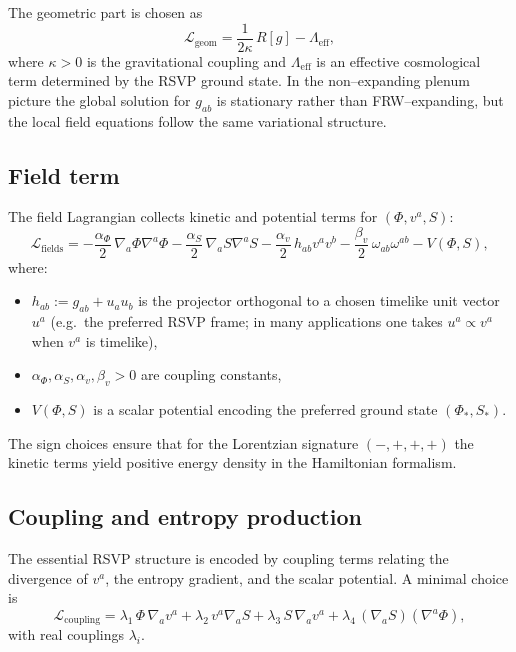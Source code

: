 The geometric part is chosen as
\begin{equation}
\mathcal{L}_{\mathrm{geom}}
  = \frac{1}{2\kappa}\,R[g]
    - \Lambda_{\mathrm{eff}},
\end{equation}
where $\kappa>0$ is the gravitational coupling and $\Lambda_{\mathrm{eff}}$ is an effective cosmological term determined by the RSVP ground state. In the non–expanding plenum picture the global solution for $g_{ab}$ is stationary rather than FRW–expanding, but the local field equations follow the same variational structure.

\subsection{Field term}

The field Lagrangian collects kinetic and potential terms for $(\Phi,v^a,S)$:
\begin{equation}
\label{eq:L-fields}
\mathcal{L}_{\mathrm{fields}}
  = -\frac{\alpha_\Phi}{2}\,\nabla_a\Phi \nabla^a\Phi
    -\frac{\alpha_S}{2}\,\nabla_a S \nabla^a S
    -\frac{\alpha_v}{2}\,h_{ab} v^a v^b
    -\frac{\beta_v}{2}\,\omega_{ab}\omega^{ab}
    -V(\Phi,S),
\end{equation}
where:
\begin{itemize}
  \item $h_{ab} := g_{ab} + u_a u_b$ is the projector orthogonal to a chosen timelike unit vector $u^a$ (e.g.\ the preferred RSVP frame; in many applications one takes $u^a \propto v^a$ when $v^a$ is timelike),
  \item $\alpha_\Phi,\alpha_S,\alpha_v,\beta_v>0$ are coupling constants,
  \item $V(\Phi,S)$ is a scalar potential encoding the preferred ground state $(\Phi_\ast,S_\ast)$.
\end{itemize}
The sign choices ensure that for the Lorentzian signature $(-,+,+,+)$ the kinetic terms yield positive energy density in the Hamiltonian formalism.

\subsection{Coupling and entropy production}

The essential RSVP structure is encoded by coupling terms relating the divergence of $v^a$, the entropy gradient, and the scalar potential. A minimal choice is
\begin{equation}
\label{eq:L-coupling}
\mathcal{L}_{\mathrm{coupling}}
  =
  \lambda_1 \,\Phi\,\nabla_a v^a
  + \lambda_2 \,v^a\nabla_a S
  + \lambda_3 \,S\,\nabla_a v^a
  + \lambda_4 \,(\nabla_a S)(\nabla^a \Phi),
\end{equation}
with real couplings $\lambda_i$.

